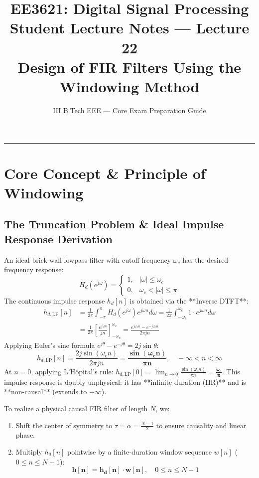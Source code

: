 \documentclass[11pt,a4paper]{article}
\title{\textbf{EE3621: Digital Signal Processing} \\ \Large Student Lecture Notes — Lecture 22 \\ \large Design of FIR Filters Using the Windowing Method}
\author{III B.Tech EEE — Core Exam Preparation Guide}
\date{}
\begin{document}
\maketitle

\noindent\rule{\textwidth}{0.5pt}

\section{Core Concept \& Principle of Windowing}

\subsection{The Truncation Problem \& Ideal Impulse Response Derivation}
An ideal brick-wall lowpass filter with cutoff frequency $\omega_c$ has the desired frequency response:
\begin{equation}
H_d(e^{j\omega}) = \begin{cases} 1, & |\omega| \le \omega_c \\ 0, & \omega_c < |\omega| \le \pi \end{cases}
\end{equation}
The continuous impulse response $h_d[n]$ is obtained via the **Inverse DTFT**:
\begin{align}
h_{d,\text{LP}}[n] &= \frac{1}{2\pi} \int_{-\pi}^{\pi} H_d(e^{j\omega}) e^{j\omega n} d\omega = \frac{1}{2\pi} \int_{-\omega_c}^{\omega_c} 1 \cdot e^{j\omega n} d\omega \nonumber \\
&= \frac{1}{2\pi} \left[ \frac{e^{j\omega n}}{jn} \right]_{-\omega_c}^{\omega_c} = \frac{e^{j\omega_c n} - e^{-j\omega_c n}}{2\pi j n}
\end{align}
Applying Euler's sine formula $e^{j\theta} - e^{-j\theta} = 2j\sin\theta$:
\begin{equation}
h_{d,\text{LP}}[n] = \frac{2j\sin(\omega_c n)}{2\pi j n} = \mathbf{\frac{\sin(\omega_c n)}{\pi n}}, \quad -\infty < n < \infty
\end{equation}
At $n = 0$, applying L'Hôpital's rule: $h_{d,\text{LP}}[0] = \lim_{n \to 0} \frac{\sin(\omega_c n)}{\pi n} = \mathbf{\frac{\omega_c}{\pi}}$.
This impulse response is doubly unphysical: it has **infinite duration (IIR)** and is **non-causal** (extends to $-\infty$).

To realize a physical causal FIR filter of length $N$, we:
\begin{enumerate}
    \item Shift the center of symmetry to $\tau = \alpha = \frac{N-1}{2}$ to ensure causality and linear phase.
    \item Multiply $h_d[n]$ pointwise by a finite-duration window sequence $w[n]$ ($0 \le n \le N-1$):
    \begin{equation}
    \mathbf{h[n] = h_d[n] \cdot w[n]}, \quad 0 \le n \le N-1
    \end{equation}
\end{enumerate}
\end{document}
